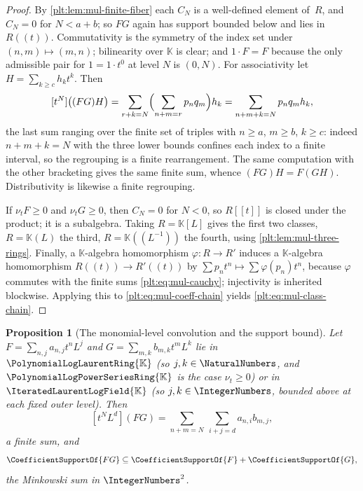 \documentclass[11pt,oneside]{article}
\theoremstyle{plain}
\newtheorem{proposition}[theorem]{Proposition}
\theoremstyle{definition}
\theoremstyle{remark}
\newcommand{\K}{\mathbb{K}}
\newcommand{\PLpow}{\PolynomialLogPowerSeriesRing{\K}}   %
\newcommand{\PLlau}{\PolynomialLogLaurentRing{\K}}       %
\newcommand{\PLit}{\IteratedLaurentLogField{\K}}         %
\newcommand{\ordt}{\nu_{t}}                              %
\begin{document}
\begin{proof}
By \cref{plt:lem:mul-finite-fiber} each $C_N$ is a well-defined element
of~$R$, and $C_N=0$ for $N<a+b$; so $FG$ again has support bounded below and
lies in $R((t))$.  Commutativity is the symmetry of the index set under
$(n,m)\mapsto(m,n)$; bilinearity over $\K$ is clear; and $1\cdot F=F$ because
the only admissible pair for $1=1\cdot t^0$ at level $N$ is $(0,N)$.  For
associativity let $H=\sum_{k\ge c}h_kt^k$.  Then
\[
 [t^N]\bigl((FG)H\bigr)
 =\sum_{r+k=N}\Bigl(\sum_{n+m=r}p_nq_m\Bigr)h_k
 =\sum_{n+m+k=N}p_nq_mh_k,
\]
the last sum ranging over the finite set of triples with $n\ge a$, $m\ge b$,
$k\ge c$: indeed $n+m+k=N$ with the three lower bounds confines each index to
a finite interval, so the regrouping is a finite rearrangement.  The same
computation with the other bracketing gives the same finite sum, whence
$(FG)H=F(GH)$.  Distributivity is likewise a finite regrouping.

If $\ordt F\ge0$ and $\ordt G\ge0$, then $C_N=0$ for $N<0$, so $R[[t]]$ is
closed under the product; it is a subalgebra.  Taking $R=\K[L]$ gives the
first two classes, $R=\K(L)$ the third, $R=\K((L^{-1}))$ the fourth, using
\cref{plt:lem:mul-three-rings}.  Finally, a $\K$-algebra homomorphism
$\varphi\colon R\to R'$ induces a $\K$-algebra homomorphism
$R((t))\to R'((t))$ by $\sum p_nt^n\mapsto\sum\varphi(p_n)t^n$, because
$\varphi$ commutes with the finite sums \eqref{plt:eq:mul-cauchy}; injectivity
is inherited blockwise.  Applying this to
\eqref{plt:eq:mul-coeff-chain} yields \eqref{plt:eq:mul-class-chain}.
\end{proof}

\begin{proposition}[The monomial-level convolution and the support bound]
\label{plt:prop:mul-monomial}
Let $F=\sum_{n,j}a_{n,j}t^nL^j$ and $G=\sum_{m,k}b_{m,k}t^mL^k$ lie in
$\PLlau$ (so $j,k\in\NaturalNumbers$, and $\PLpow$ is the case
$\ordt\ge0$) or in $\PLit$ (so $j,k\in\IntegerNumbers$, bounded above at
each fixed outer level).  Then
\begin{equation}\label{plt:eq:mul-2d-convolution}
 [t^NL^d](FG)
 =\sum_{n+m=N}\ \sum_{i+j=d}a_{n,i}b_{m,j},
\end{equation}
a finite sum, and
\begin{equation}\label{plt:eq:mul-support}
 \CoefficientSupportOf{FG}
 \subseteq
 \CoefficientSupportOf{F}+\CoefficientSupportOf{G},
\end{equation}
the Minkowski sum in $\IntegerNumbers^2$.
\end{proposition}
\end{document}
